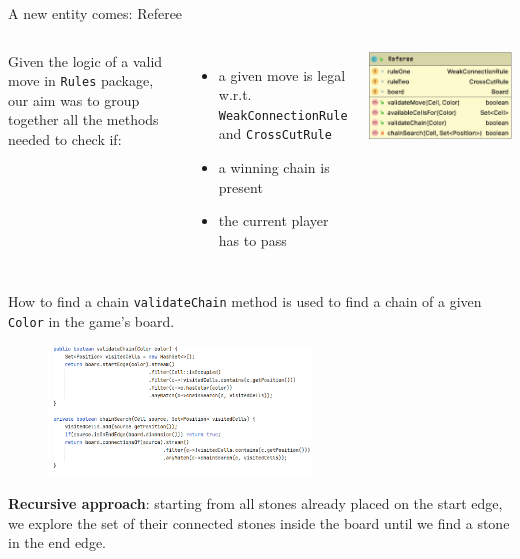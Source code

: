 \documentclass{beamer}
\begin{document}
\begin{frame}{A new entity comes: Referee }
	\begin{columns}
		Given the logic of a valid move in \texttt{Rules} package, our aim was to group together all the methods needed to check if:
		\vspace{0.4cm}
		\begin{itemize}
			\item a given move is legal w.r.t. \texttt{WeakConnectionRule} and \texttt{CrossCutRule}
			\vspace{0.25cm}
			\item a winning chain is present
			\vspace{0.25cm}
			\item the current player has to pass
		\end{itemize}
		
		
		\includegraphics[scale=0.27]{images/referee-class.jpg}
		
	\end{columns}
\end{frame}

\begin{frame}{How to find a chain}
	\texttt{validateChain} method is used to find a chain of a given \texttt{Color} in the game's board.
	
	
	\begin{figure}
		\includegraphics[scale=0.2, width=7cm]{images/chainsearch-code.png}
	\end{figure}
	
	\textbf{Recursive approach}: starting from all stones already placed on the start edge, we explore the set of their connected stones inside the board until we find a stone in the end edge.
\end{frame}
\end{document}
